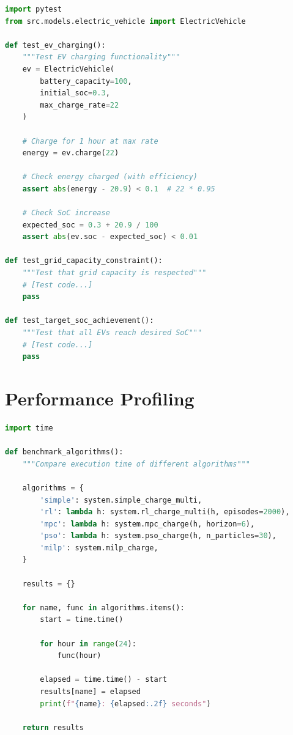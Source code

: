 \begin{lstlisting}[language=Python,caption={Example unit test}]
import pytest
from src.models.electric_vehicle import ElectricVehicle

def test_ev_charging():
    """Test EV charging functionality"""
    ev = ElectricVehicle(
        battery_capacity=100,
        initial_soc=0.3,
        max_charge_rate=22
    )
    
    # Charge for 1 hour at max rate
    energy = ev.charge(22)
    
    # Check energy charged (with efficiency)
    assert abs(energy - 20.9) < 0.1  # 22 * 0.95
    
    # Check SoC increase
    expected_soc = 0.3 + 20.9 / 100
    assert abs(ev.soc - expected_soc) < 0.01

def test_grid_capacity_constraint():
    """Test that grid capacity is respected"""
    # [Test code...]
    pass

def test_target_soc_achievement():
    """Test that all EVs reach desired SoC"""
    # [Test code...]
    pass
\end{lstlisting}

\section{Performance Profiling}
\label{app:profiling}

\begin{lstlisting}[language=Python,caption={Algorithm timing comparison}]
import time

def benchmark_algorithms():
    """Compare execution time of different algorithms"""
    
    algorithms = {
        'simple': system.simple_charge_multi,
        'rl': lambda h: system.rl_charge_multi(h, episodes=2000),
        'mpc': lambda h: system.mpc_charge(h, horizon=6),
        'pso': lambda h: system.pso_charge(h, n_particles=30),
        'milp': system.milp_charge,
    }
    
    results = {}
    
    for name, func in algorithms.items():
        start = time.time()
        
        for hour in range(24):
            func(hour)
        
        elapsed = time.time() - start
        results[name] = elapsed
        print(f"{name}: {elapsed:.2f} seconds")
    
    return results
\end{lstlisting}

